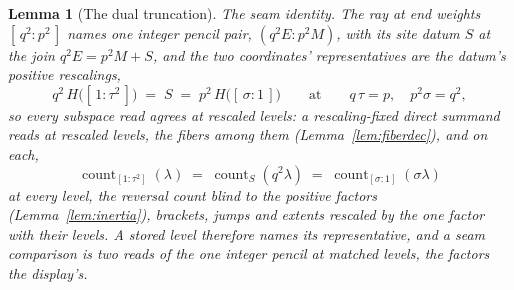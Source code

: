\documentclass[11pt]{article}
\newtheorem{lemma}{Lemma}
\theoremstyle{definition}
\begin{document}
\begin{lemma}[The dual truncation]
\emph{The seam identity.} The ray at end weights $[\,q^2:p^2\,]$
names one integer pencil pair, $(q^2E:p^2M)$, with its site datum
$S$ at the join $q^2E=p^2M+S$, and the two coordinates'
representatives are the datum's positive rescalings,
\[
q^2\,H\big([\,1:\tau^2\,]\big)\;=\;S\;=\;p^2\,H\big([\,\sigma:1\,]\big)
\qquad\text{at}\qquad q\,\tau=p,\quad p^2\sigma=q^2 ,
\]
so every subspace read agrees at rescaled levels: a
rescaling-fixed direct summand reads at rescaled levels, the
fibers among them (Lemma~\ref{lem:fiberdec}), and on each,
\[
\operatorname{count}_{[1:\tau^2]}(\lambda)
\;=\;\operatorname{count}_{S}(q^2\lambda)
\;=\;\operatorname{count}_{[\sigma:1]}(\sigma\lambda)
\]
at every level, the reversal count blind to the positive factors
(Lemma~\ref{lem:inertia}), brackets, jumps and extents rescaled by the one
factor with their levels. A stored level therefore names its
representative, and a seam comparison is two reads of the one integer
pencil at matched levels, the factors the display's.

\end{lemma}
\end{document}
